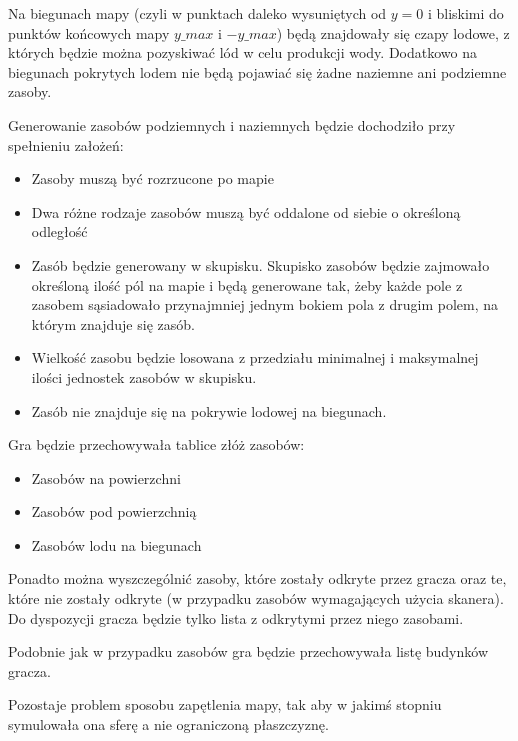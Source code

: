 \documentclass[a4paper,12pt]{article}
\begin{document}
Na biegunach mapy (czyli w punktach daleko wysuniętych od $y = 0$ i bliskimi do punktów końcowych mapy $y\_max$ i $-y\_max$) będą znajdowały się czapy lodowe, z których będzie można pozyskiwać lód w celu produkcji wody. Dodatkowo na biegunach pokrytych lodem nie będą pojawiać się żadne naziemne ani podziemne zasoby.

Generowanie zasobów podziemnych i naziemnych będzie dochodziło przy spełnieniu założeń:
\begin{itemize}
	\item Zasoby muszą być rozrzucone po mapie
	\item Dwa różne rodzaje zasobów muszą być oddalone od siebie o określoną odległość
	\item Zasób będzie generowany w skupisku. Skupisko zasobów będzie zajmowało określoną ilość pól na mapie i będą generowane tak, żeby każde pole z zasobem sąsiadowało przynajmniej jednym bokiem pola z drugim polem, na którym znajduje się zasób. 
	\item Wielkość zasobu będzie losowana z przedziału minimalnej i maksymalnej ilości jednostek zasobów w skupisku.
	\item Zasób nie znajduje się na pokrywie lodowej na biegunach.
\end{itemize}

Gra będzie przechowywała tablice złóż zasobów:
\begin{itemize}
	\item Zasobów na powierzchni
	\item Zasobów pod powierzchnią
	\item Zasobów lodu na biegunach
\end{itemize}

Ponadto można wyszczególnić zasoby, które zostały odkryte przez gracza oraz te, które nie zostały odkryte (w przypadku zasobów wymagających użycia skanera). Do dyspozycji gracza będzie tylko lista z odkrytymi przez niego zasobami.

Podobnie jak w przypadku zasobów gra będzie przechowywała listę budynków gracza.

Pozostaje problem sposobu zapętlenia mapy, tak aby w jakimś stopniu symulowała ona sferę a nie ograniczoną płaszczyznę. 
\end{document}
